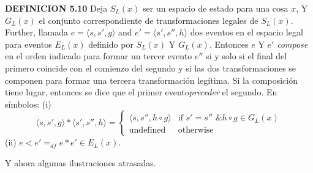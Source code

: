 \begin{justifying}
    \textbf{DEFINICION 5.10} Deja $S_L(x)$ ser un espacio de estado para una cosa $x$, Y   $G_L(x)$ el conjunto correspondiente de transformaciones legales de $S_L(x)$. Further,  llamada $e=\langle s, s', g \rangle$ and $e' = \langle s', s'', h \rangle$ dos eventos en el espacio legal para eventos $E_L(x)$ definido por $S_L(x)$ Y $G_L(x)$.  Entonces $e$ Y $e'$ \textit{compose} en el orden indicado para formar un tercer evento $e''$ si y solo si el final del primero coincide con el comienzo del segundo y si las dos transformaciones se componen para formar una tercera transformación legítima. Si la composición tiene lugar, entonces se dice que el primer evento\textit{preceder} el segundo. En símbolos:
    (i)
    \[
    \langle s, s', g \rangle * \langle s', s'', h \rangle =
    \begin{cases}
        \langle s, s'', h \circ g \rangle & \text{if } s' = s'' \text{ \& } h   \circ g \in G_L(x) \\
        \text{undefined} & \text{otherwise}
    \end{cases}
    \]
    (ii) $e < e' =_{df} e * e' \in E_L(x)$.

    Y ahora algunas ilustraciones atrasadas.


\end{justifying}
